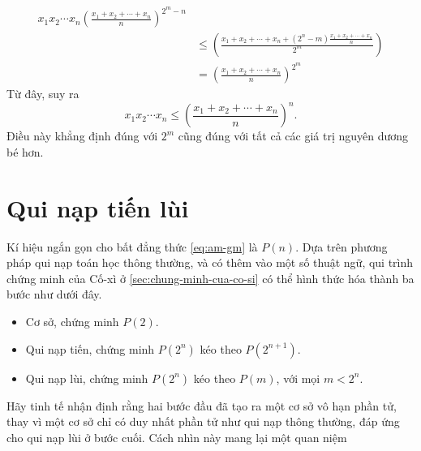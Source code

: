 \documentclass[12pt]{article} %
\begin{document}
\begin{align*}
    x_1x_2\cdots x_n\left(\frac{x_1+x_2+\cdots+x_n}{n}\right)^{2^m-n}\\&\leq\left(\frac{x_1+x_2+\cdots+x_n+(2^n-m)\frac{x_1+x_2+\cdots+x_n}{n}}{2^m}\right)\\&=\left(\frac{x_1+x_2+\cdots+x_n}{n}\right)^{2^m}
\end{align*}
Từ đây, suy ra
\[x_1x_2\cdots x_n\leq\left(\frac{x_1+x_2+\cdots+x_n}{n}\right)^n.\]
Điều này khẳng định đúng với \(2^m\) cũng đúng với tất cả các giá trị nguyên dương bé hơn.

\section{Qui nạp tiến lùi}
Kí hiệu ngắn gọn cho bất đẳng thức \eqref{eq:am-gm} là \(P(n)\). Dựa trên phương pháp qui nạp toán học thông thường, và có thêm vào một số thuật ngữ, qui trình chứng minh của Cố-xì ở \autoref{sec:chung-minh-cua-co-si} có thể hình thức hóa thành ba bước như dưới đây.
\begin{itemize}
    \item Cơ sở, chứng minh \(P(2)\).
    \item Qui nạp tiến, chứng minh \(P(2^n)\) kéo theo \(P(2^{n+1})\).
    \item Qui nạp lùi, chứng minh \(P(2^n)\) kéo theo \(P(m)\), với mọi \(m<2^n\).
\end{itemize}
Hãy tinh tế nhận định rằng hai bước đầu đã tạo ra một cơ sở vô hạn phần tử, thay vì một cơ sở chỉ có duy nhất phần tử như qui nạp thông thường, đáp ứng cho qui nạp lùi ở bước cuối. Cách nhìn này mang lại một quan niệm
\end{document}
